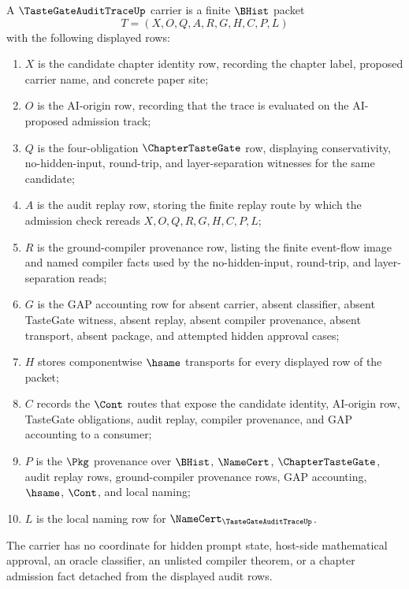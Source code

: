 \begin{definition}
\label{def:taste-gate-audit-trace-carrier}
A $\TasteGateAuditTraceUp$ carrier is a finite $\BHist$ packet
$$
T=(X,O,Q,A,R,G,H,C,P,L)
$$
with the following displayed rows:
\begin{enumerate}
\item $X$ is the candidate chapter identity row, recording the chapter label, proposed carrier name, and concrete paper site;
\item $O$ is the AI-origin row, recording that the trace is evaluated on the AI-proposed admission track;
\item $Q$ is the four-obligation $\ChapterTasteGate$ row, displaying conservativity, no-hidden-input, round-trip, and layer-separation witnesses for the same candidate;
\item $A$ is the audit replay row, storing the finite replay route by which the admission check rereads $X,O,Q,R,G,H,C,P,L$;
\item $R$ is the ground-compiler provenance row, listing the finite event-flow image and named compiler facts used by the no-hidden-input, round-trip, and layer-separation reads;
\item $G$ is the GAP accounting row for absent carrier, absent classifier, absent TasteGate witness, absent replay, absent compiler provenance, absent transport, absent package, and attempted hidden approval cases;
\item $H$ stores componentwise $\hsame$ transports for every displayed row of the packet;
\item $C$ records the $\Cont$ routes that expose the candidate identity, AI-origin row, TasteGate obligations, audit replay, compiler provenance, and GAP accounting to a consumer;
\item $P$ is the $\Pkg$ provenance over $\BHist$, $\NameCert$, $\ChapterTasteGate$, audit replay rows, ground-compiler provenance rows, GAP accounting, $\hsame$, $\Cont$, and local naming;
\item $L$ is the local naming row for $\NameCert_{\TasteGateAuditTraceUp}$.
\end{enumerate}
The carrier has no coordinate for hidden prompt state, host-side mathematical approval, an oracle classifier, an unlisted compiler theorem, or a chapter admission fact detached from the displayed audit rows.
\end{definition}

